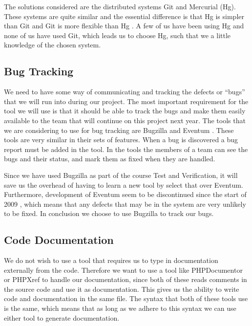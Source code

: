 The solutions considered are the distributed systems Git and Mercurial (Hg).
These systems are quite similar and the essential difference is that Hg is simpler than Git and Git is more flexible than Hg \cite{gitVsHg}.
A few of us have been using Hg and none of us have used Git, which leads us to choose Hg, such that we a little knowledge of the chosen system.

\subsection{Bug Tracking}
We need to have some way of communicating and tracking the defects or ``bugs'' that we will run into during our project.
The most important requirement for the tool we will use is that it should be able to track the bugs and make them easily available to the team that will continue on this project next year.
The tools that we are considering to use for bug tracking are Bugzilla \cite{bugzillaFeat} and Eventum \cite{eventumFeat}.
These tools are very similar in their sets of features.
When a bug is discovered a bug report must be added in the tool.
In the tools the members of a team can see the bugs and their status, and mark them as fixed when they are handled.

Since we have used Bugzilla as part of the course Test and Verification, it will save us the overhead of having to learn a new tool by select that over Eventum.
Furthermore, development of Eventum seem to be discontinued since the start of 2009 \cite{eventumDiscont}, which means that any defects that may be in the system are very unlikely to be fixed.
In conclusion we choose to use Bugzilla to track our bugs.

\subsection{Code Documentation}
We do not wish to use a tool that requires us to type in documentation externally from the code.
Therefore we want to use a tool like PHPDocumentor \cite{phpdocumentor} or PHPXref \cite{phpxref} to handle our documentation, since both of these reads comments in the source code and use it as documentation.
This gives us the ability to write code and documentation in the same file.
The syntax that both of these tools use is the same, which means that as long as we adhere to this syntax we can use either tool to generate documentation.

